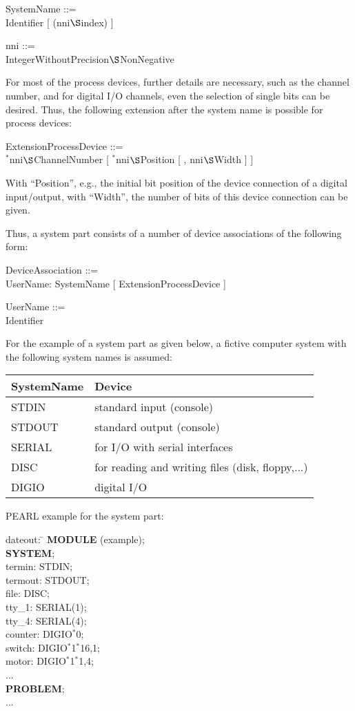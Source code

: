 \begin{removed}
SystemName ::=\\
\x Identifier [ (nni$\S $index) ]

nni ::=\\
\x IntegerWithoutPrecision$\S $NonNegative

For most of the process devices, further details are necessary, such as
the channel number, and for digital I/O channels, even the selection of
single bits can be desired. Thus, the following extension after the
system name is possible for process devices:

ExtensionProcessDevice ::=\\
\x $^*$nni$\S $ChannelNumber [ $^*$nni$\S $Position [ , nni$\S $Width ] ]

With ``Position'', e.g., the initial bit position of the device
connection of a digital input/output, with ``Width'', the number of bits
of this device connection can be given.

Thus, a system part consists of a number of device associations of the
following form:

DeviceAssociation ::=\\
\x UserName: SystemName [ ExtensionProcessDevice ]

UserName ::=\\
\x Identifier

For the example of a system part as given below, a fictive computer
system with the following system names is assumed:

\begin{tabular}{l@{\x}l}
SystemName & Device \\ \hline
STDIN      & standard input (console) \\
STDOUT     & standard output (console) \\
SERIAL     & for I/O with serial interfaces \\
DISC       & for reading and writing files (disk, floppy,...)\\
DIGIO      & digital I/O\\
\end{tabular}

PEARL example for the system part:

\begin{tabbing}
\x dateout: \= \kill
{\bf MODULE} (example); \> \\
{\bf SYSTEM}; \> \\
\x termin:  \> STDIN; \\
\x termout: \> STDOUT;\\
\x file:    \> DISC;  \\
\x tty\_1:  \> SERIAL(1);\\
\x tty\_4:  \> SERIAL(4);\\
\x counter: \> DIGIO$^*$0; \\
\x switch:  \> DIGIO$^*$1$^*$16,1; \\
\x motor:   \> DIGIO$^*$1$^*$1,4;  \\
\x ... \> \\
{\bf PROBLEM};\> \\
\x ... \>
\end{tabbing}
\end{removed}

